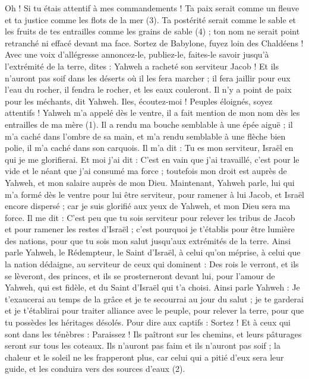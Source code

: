 \begin{multicols}{2}
Oh ! Si tu étais attentif à mes commandements ! Ta paix serait comme un fleuve et ta justice comme les flots de la mer (3).
Ta postérité serait comme le sable et les fruits de tes entrailles comme les grains de sable (4) ; ton nom ne serait point retranché ni effacé devant ma face.
Sortez de Babylone, fuyez loin des Chaldéens ! Avec une voix d’allégresse annoncez-le, publiez-le, faites-le savoir jusqu’à l’extrémité de la terre, dites : Yahweh a racheté son serviteur Jacob !
Et ils n’auront pas soif dans les déserts où il les fera marcher ; il fera jaillir pour eux l’eau du rocher, il fendra le rocher, et les eaux couleront.
Il n'y a point de paix pour les méchants, dit Yahweh.
\VerseOne{}Iles, écoutez-moi ! Peuples éloignés, soyez attentifs ! Yahweh m'a appelé dès le ventre, il a fait mention de mon nom dès les entrailles de ma mère (1).
Il a rendu ma bouche semblable à une épée aiguë ; il m'a caché dans l'ombre de sa main, et m'a rendu semblable à une flèche bien polie, il m'a caché dans son carquois.
Il m'a dit : Tu es mon serviteur, Israël en qui je me glorifierai.
Et moi j'ai dit : C’est en vain que j’ai travaillé, c’est pour le vide et le néant que j’ai consumé ma force ; toutefois mon droit est auprès de Yahweh, et mon salaire auprès de mon Dieu.
Maintenant, Yahweh parle, lui qui m'a formé dès le ventre pour lui être serviteur, pour ramener à lui Jacob, et Israël encore dispersé ; car je suis glorifié aux yeux de Yahweh, et mon Dieu sera ma force.
Il me dit : C'est peu que tu sois serviteur pour relever les tribus de Jacob et pour ramener les restes d'Israël ; c'est pourquoi je t’établis pour être lumière des nations, pour que tu sois mon salut jusqu’aux extrémités de la terre.
Ainsi parle Yahweh, le Rédempteur, le Saint d'Israël, à celui qu’on méprise, à celui que la nation dédaigne, au serviteur de ceux qui dominent : Des rois le verront, et ils se lèveront, des princes, et ils se prosterneront devant lui, pour l'amour de Yahweh, qui est fidèle, et du Saint d'Israël qui t'a choisi.
Ainsi parle Yahweh : Je t’exaucerai au temps de la grâce et je te secourrai au jour du salut ; je te garderai et je t’établirai pour traiter alliance avec le peuple, pour relever la terre, pour que tu possèdes les héritages désolés.
Pour dire aux captifs : Sortez ! Et à ceux qui sont dans les ténèbres : Paraissez ! Ils paîtront sur les chemins, et leurs pâturages seront sur tous les coteaux.
Ils n'auront pas faim et ils n'auront pas soif ; la chaleur et le soleil ne les frapperont plus, car celui qui a pitié d'eux sera leur guide, et les conduira vers des sources d'eaux (2).

\end{multicols}
